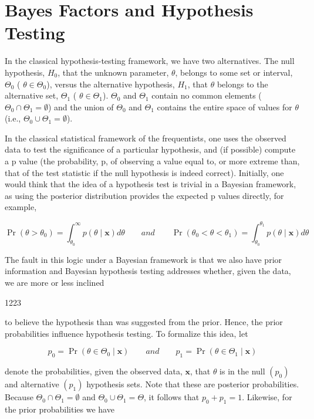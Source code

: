 \documentclass{article}
\begin{document}
\section{Bayes Factors and Hypothesis Testing}
In the classical hypothesis-testing framework, we have two alternatives. The null hypothesis,  $ H_0 $, that the unknown parameter,  $ \theta $, belongs to some set or interval,  $ \Theta_0 $ ( $ \theta \in \Theta_0 $), versus the alternative hypothesis,  $ H_1 $, that  $ \theta $ belongs to the alternative set,  $ \Theta_1 $ ( $ \theta \in \Theta_1 $).  $ \Theta_0 $ and  $ \Theta_1 $ contain no common elements ( $ \Theta_0 \cap \Theta_1 = \emptyset $) and the union of  $ \Theta_0 $ and  $ \Theta_1 $ contains the entire space of values for  $ \theta $ (i.e.,  $ \Theta_0 \cup \Theta_1 = \emptyset $).

In the classical statistical framework of the frequentists, one uses the observed data to test the significance of a particular hypothesis, and (if possible) compute a p value (the probability, p, of observing a value equal to, or more extreme than, that of the test statistic if the null hypothesis is indeed correct). Initially, one would think that the idea of a hypothesis test is trivial in a Bayesian framework, as using the posterior distribution provides the expected p values directly, for example,

\begin{equation}
\Pr(\theta>\theta_{0})=\int_{\theta_{0}}^{\infty}p(\theta\mid\mathbf{x})d\theta\qquad and\qquad\Pr(\theta_{0}<\theta<\theta_{1})=\int_{\theta_{0}}^{\theta_{1}}p(\theta\mid\mathbf{x})d\theta
\end{equation}

The fault in this logic under a Bayesian framework is that we also have prior information and Bayesian hypothesis testing addresses whether, given the data, we are more or less inclined

1223

to believe the hypothesis than was suggested from the prior. Hence, the prior probabilities influence hypothesis testing. To formalize this idea, let

\begin{equation}
p_{0}=\Pr(\theta\in\Theta_{0}\mid\mathbf{x})\qquad and\qquad p_{1}=\Pr(\theta\in\Theta_{1}\mid\mathbf{x})
\end{equation}

denote the probabilities, given the observed data,  $ \mathbf{x} $, that  $ \theta $ is in the null  $ (p_0) $ and alternative  $ (p_1) $ hypothesis sets. Note that these are posterior probabilities. Because  $ \Theta_0 \cap \Theta_1 = \emptyset $ and  $ \Theta_0 \cup \Theta_1 = \Theta $, it follows that  $ p_0 + p_1 = 1 $. Likewise, for the prior probabilities we have
\end{document}

